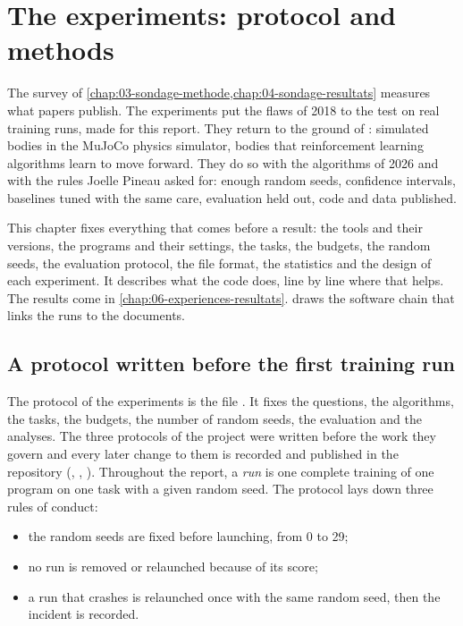 \chapter{The experiments: protocol and methods}\label{chap:05-experiences-methode}

The survey of \cref{chap:03-sondage-methode,chap:04-sondage-resultats} measures what papers publish. The
experiments put the flaws of 2018 to the test on real training runs, made for this report. They return to the
ground of \textcite{henderson2018matters}: simulated bodies in the MuJoCo physics simulator, bodies that
reinforcement learning algorithms learn to move forward. They do so with the algorithms of 2026 and with the
rules Joelle Pineau asked for: enough random seeds, confidence intervals, baselines tuned with the same care,
evaluation held out, code and data published.

This chapter fixes everything that comes before a result: the tools and their versions, the programs and their
settings, the tasks, the budgets, the random seeds, the evaluation protocol, the file format, the statistics
and the design of each experiment. It describes what the code does, line by line where that helps. The results come in
\cref{chap:06-experiences-resultats}.  draws the software chain that links the runs to
the documents.

\section{A protocol written before the first training run}\label{sec:protocole}

The protocol of the experiments is the file . It fixes the questions, the
algorithms, the tasks, the budgets, the number of random seeds, the evaluation and the analyses. The three
protocols of the project were written before the work they govern and every later change to them is recorded
and published in the repository (, ,
). Throughout the report, a \emph{run} is one
complete training of one program on one task with a given random seed. The protocol lays down three rules of
conduct:
\begin{itemize}
  \item the random seeds are fixed before launching, from 0 to 29;
  \item no run is removed or relaunched because of its score;
  \item a run that crashes is relaunched once with the same random seed, then the incident is recorded.
\end{itemize}

